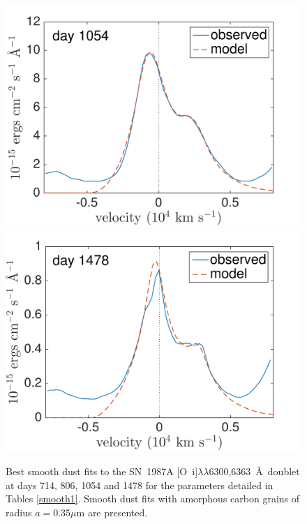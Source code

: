 \begin{figure}
\includegraphics[trim =0 0 0 -20,clip=true,scale=0.37]{chapters/chapter5/images/smooth/best_fit/d1054OI.pdf}
\hspace{0mm}
\includegraphics[trim =0 0 0 -20,clip=true,scale=0.37]{chapters/chapter5/images/smooth/best_fit/d1478OI.pdf}
\caption{Best smooth dust fits to the SN~1987A [O~{\sc i}]$\lambda\lambda$6300,6363~\AA\ doublet at days 714, 806, 1054 and 1478 for the parameters detailed in Tables \ref{smooth1}.  Smooth dust fits with amorphous carbon grains of radius $a=0.35 \mu$m are presented.}
\label{OI_smooth}
\end{figure}


